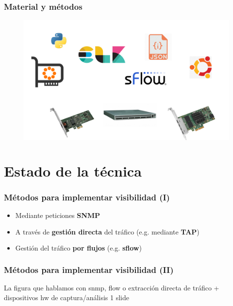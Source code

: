 \documentclass{beamer}
\begin{document}

\begin{frame}
\frametitle{Material y métodos}

\begin{figure}[H]
	\centering
	\includegraphics[scale=0.30]{material.png}
	\label{material}
\end{figure}

\end{frame}

\section{Estado de la técnica}


\begin{frame}

\frametitle{Métodos para implementar visibilidad (I)}
\begin{itemize}
	\item Mediante peticiones \textbf{SNMP}
	\item A través de \textbf{gestión directa} del tráfico (e.g. mediante \textbf{TAP})
	\item Gestión del tráfico \textbf{por flujos} (e.g. \textbf{sflow})
\end{itemize}

\end{frame}

\begin{frame}
\frametitle{Métodos para implementar visibilidad (II)}
La figura que hablamos con snmp, flow o extracción directa de tráfico + dispositivos hw de captura/análisis 1 slide
\end{frame}
\end{document}
